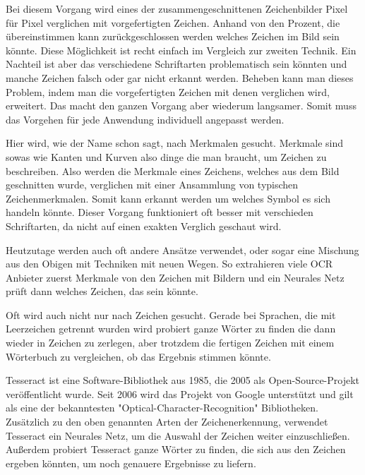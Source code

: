 Bei diesem Vorgang wird eines der zusammengeschnittenen Zeichenbilder Pixel für Pixel verglichen mit vorgefertigten Zeichen. Anhand von den Prozent, die übereinstimmen kann zurückgeschlossen werden welches Zeichen im Bild sein könnte. Diese Möglichkeit ist recht einfach im Vergleich zur zweiten Technik. Ein Nachteil ist aber das verschiedene Schriftarten problematisch sein könnten und manche Zeichen falsch oder gar nicht erkannt werden. Beheben kann man dieses Problem, indem man die vorgefertigten Zeichen mit denen verglichen wird, erweitert. Das macht den ganzen Vorgang aber wiederum langsamer. Somit muss das Vorgehen für jede Anwendung individuell angepasst werden.


Hier wird, wie der Name schon sagt, nach Merkmalen gesucht. Merkmale sind sowas wie Kanten und Kurven also dinge die man braucht, um Zeichen zu beschreiben. Also werden die Merkmale eines Zeichens, welches aus dem Bild geschnitten wurde, verglichen mit einer Ansammlung von typischen Zeichenmerkmalen. Somit kann erkannt werden um welches Symbol es sich handeln könnte. Dieser Vorgang funktioniert oft besser mit verschieden Schriftarten, da nicht auf einen exakten Verglich geschaut wird.

Heutzutage werden auch oft andere Ansätze verwendet, oder sogar eine Mischung aus den Obigen mit Techniken mit neuen Wegen. So extrahieren viele OCR Anbieter zuerst Merkmale von den Zeichen mit Bildern und ein Neurales Netz prüft dann welches Zeichen, das sein könnte.

Oft wird auch nicht nur nach Zeichen gesucht. Gerade bei Sprachen, die mit Leerzeichen getrennt wurden wird probiert ganze Wörter zu finden die dann wieder in Zeichen zu zerlegen, aber trotzdem die fertigen Zeichen mit einem Wörterbuch zu vergleichen, ob das Ergebnis stimmen könnte.

\label{sec:tesseract}

Tesseract ist eine Software-Bibliothek aus 1985, die 2005 als Open-Source-Projekt veröffentlicht wurde. Seit 2006 wird das Projekt von Google unterstützt und gilt als eine der bekanntesten "Optical-Character-Recognition" Bibliotheken. Zusätzlich zu den oben genannten Arten der Zeichenerkennung, verwendet Tesseract ein Neurales Netz, um die Auswahl der Zeichen weiter einzuschließen. Außerdem probiert Tesseract ganze Wörter zu finden, die sich aus den Zeichen ergeben könnten, um noch genauere Ergebnisse zu liefern.\cite{OCRIntro}

